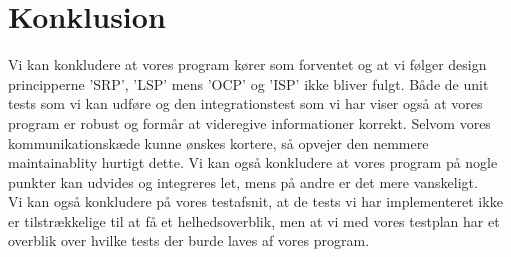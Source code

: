 \section{Konklusion}
Vi kan konkludere at vores program kører som forventet og at vi følger design principperne 'SRP', 'LSP' mens 'OCP' og 'ISP' ikke bliver fulgt. Både de unit tests som vi kan udføre og den integrationstest som vi har viser også at vores program er robust og formår at videregive informationer korrekt. Selvom vores kommunikationskæde kunne ønskes kortere, så opvejer den nemmere maintainablity hurtigt dette. Vi kan også konkludere at vores program på nogle punkter kan udvides og integreres let, mens på andre er det mere vanskeligt.\\
Vi kan også konkludere på vores testafsnit, at de tests vi har implementeret ikke er tilstrækkelige til at få et helhedsoverblik, men at vi med vores testplan har et overblik over hvilke tests der burde laves af vores program.
